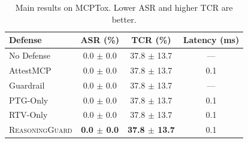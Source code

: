 \begin{table}[t]
\centering
\small
\begin{tabular}{lccc}
\toprule
Defense & ASR (\%) & TCR (\%) & Latency (ms) \\
\midrule
No Defense & 0.0 $\pm$ 0.0 & 37.8 $\pm$ 13.7 & --- \\
AttestMCP & 0.0 $\pm$ 0.0 & 37.8 $\pm$ 13.7 & 0.1 \\
Guardrail & 0.0 $\pm$ 0.0 & 37.8 $\pm$ 13.7 & --- \\
PTG-Only & 0.0 $\pm$ 0.0 & 37.8 $\pm$ 13.7 & 0.1 \\
RTV-Only & 0.0 $\pm$ 0.0 & 37.8 $\pm$ 13.7 & 0.1 \\
\textsc{ReasoningGuard} & \textbf{0.0 $\pm$ 0.0} & \textbf{37.8 $\pm$ 13.7} & 0.1 \\
\bottomrule
\end{tabular}
\caption{Main results on MCPTox. Lower ASR and higher TCR are better.}
\label{tab:main}
\end{table}
